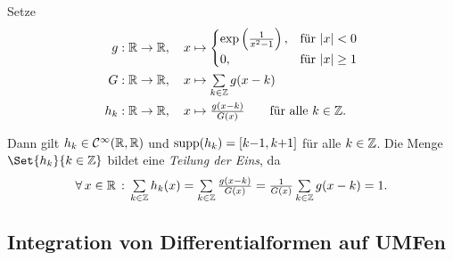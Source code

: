 \documentclass{cheat-sheet}
\newcommand{\Cont}{\mathcal{C}} %
\theoremstyle{definition}
\begin{document}
\begin{samepage}

\begin{bem}
  Setze %
  \begin{align*}
    g : \R \to \R, \quad x &\mapsto \begin{cases} \exp \left( \tfrac{1}{x^2 - 1} \right), & \text{für } \abs{x} < 0 \\ 0, & \text{für } \abs{x} \geq 1 \end{cases} \\
    G : \R \to \R, \quad x &\mapsto \sum_{k \in \Z} g(x-k) \\
    h_k : \R \to \R, \quad x &\mapsto \tfrac{g(x-k)}{G(x)} \qquad \text{für alle $k \in \Z$.}
  \end{align*}

  Dann gilt $h_k \in \Cont^\infty(\R, \R)$ und $\operatorname{supp}(h_k) = \left[ k{-}1, k{+}1 \right]$ für alle $k \in \mathbb{Z}$.
  Die Menge $\Set{h_k}{k \in \Z}$ bildet eine \emph{Teilung der Eins}, da
  \[ \fa{x \in \R} \sum_{k \in \Z} h_k(x) = \sum_{k \in \Z} \tfrac{g(x-k)}{G(x)} = \tfrac{1}{G(x)} \sum_{k \in \Z} g(x-k) = 1. \]
\end{bem}

\iffalse
  Sei $q = (q_1, \ldots, q_n) \in \Z^n$, $\epsilon > 0$

  $\d \alpha_{q,\epsilon} : \R^n \to \R, (x_1, \ldots, x_n) \mapsto \prod_{j=1}^{n} h_{q_j} \cdot (\frac{x_j}{\epsilon})$

  Es gilt:

  \begin{itemize}
    \item $\d \alpha_{q, \epsilon}$ ist $\Cont^\infty$
    \item $\mathrm{supp} \alpha_{q,\epsilon} = \Set{ (x_1, \ldots, x_n) \in \R^n }{ \abs{x_j - \epsilon q_j} \leq \epsilon \text{ für alle } j \in \{ 1, \ldots, n \} }$
    \item $\sum_{q \in \Z^n} \alpha_{q, \epsilon} = 1$ (Übung)
  \end{itemize}
\fi


\subsection{Integration von Differentialformen auf UMFen}

\end{samepage}
\end{document}
